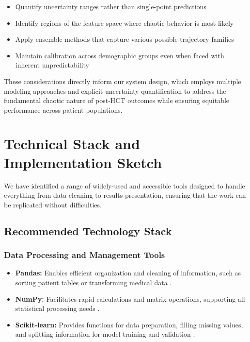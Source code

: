 \begin{itemize}
    \item Quantify uncertainty ranges rather than single-point predictions
    \item Identify regions of the feature space where chaotic behavior is most likely
    \item Apply ensemble methods that capture various possible trajectory families
    \item Maintain calibration across demographic groups even when faced with inherent unpredictability
\end{itemize}

These considerations directly inform our system design, which employs multiple modeling approaches and explicit uncertainty quantification to address the fundamental chaotic nature of post-HCT outcomes while ensuring equitable performance across patient populations.

\section{Technical Stack and Implementation Sketch}

We have identified a range of widely-used and accessible tools designed to handle everything from data cleaning to results presentation, ensuring that the work can be replicated without difficulties.

\subsection{Recommended Technology Stack}

\subsubsection{Data Processing and Management Tools}

\begin{itemize}
    \item \textbf{Pandas:} Enables efficient organization and cleaning of information, such as sorting patient tables or transforming medical data \cite{geeksforgeeks_pandas}.
    
    \item \textbf{NumPy:} Facilitates rapid calculations and matrix operations, supporting all statistical processing needs \cite{dataquest_numpy}.
    
    \item \textbf{Scikit-learn:} Provides functions for data preparation, filling missing values, and splitting information for model training and validation \cite{pushkarna_preprocessing}.
\end{itemize}


